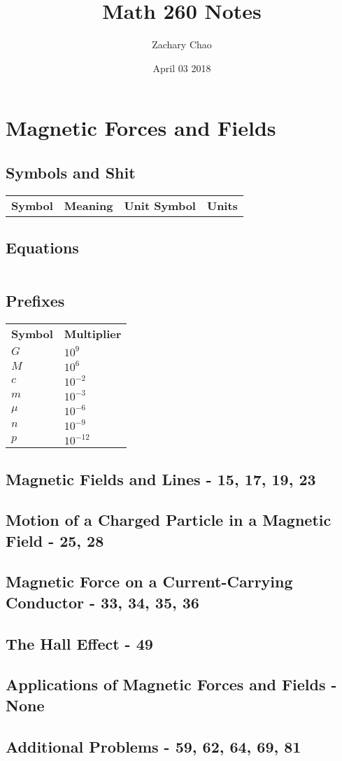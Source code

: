 \documentclass[12pt, letterpaper, twoside]{article}
\title{Math 260 Notes}
\author{Zachary Chao}
\date{April 03 2018}
\begin{document}
\setcounter{section}{10}
\section{Magnetic Forces and Fields}
  \subsection*{Symbols and Shit}
    \begin{tabular}{c l c l}
  	  \textbf{Symbol} & \textbf{Meaning} & \textbf{Unit Symbol} & \textbf{Units}\\
    \end{tabular}
  
  \subsection*{Equations}
    \begin{tabular}{l c l}
    \end{tabular}
    
    
  \subsection*{Prefixes}
    \begin{tabular}{l l}
  	  \textbf{Symbol} & \textbf{Multiplier}\\
      $G$ & $10^9$\\
      $M$ & $10^6$\\
      $c$ & $10^{-2}$\\
      $m$ & $10^{-3}$\\
      $\mu$ & $10^{-6}$\\
      $n$ & $10^{-9}$\\
      $p$ & $10^{-12}$\\
  \end{tabular}
  
  \setcounter{subsection}{1}
  \subsection{Magnetic Fields and Lines - 15, 17, 19, 23}
  
  
  \subsection{Motion of a Charged Particle in a Magnetic Field - 25, 28}
  
  
  \subsection{Magnetic Force on a Current-Carrying Conductor - 33, 34, 35, 36}
  
  
  \subsection{The Hall Effect - 49}
  
  
  \subsection{Applications of Magnetic Forces and Fields - None}
  
  
  \subsection{Additional Problems - 59, 62, 64, 69, 81}
    
\end{document}
